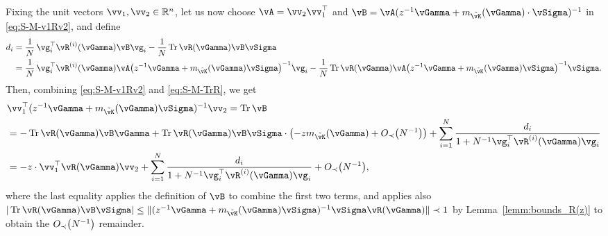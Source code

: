 \begin{proof-of-lemma}
Fixing the unit vectors $\vv_1,\vv_2 \in \R^n$,
let us now choose $\vA=\vv_2\vv_1^\top$ and
$\vB=\vA(z^{-1}\vGamma+m_{\tilde \vK}(\vGamma)\cdot\vSigma )^{-1}$
in \eqref{eq:S-M-v1Rv2}, and define
	\begin{align*}
d_i&=\frac{1}{N}\,\vg_i^\top \vR^{(i)}(\vGamma)\vB\vg_i
	-\frac{1}{N}\Tr \vR(\vGamma)\vB\vSigma\\
&=\frac{1}{N}\,\vg_i^\top \vR^{(i)}(\vGamma)\vA
	\left(z^{-1}\vGamma+m_{\tilde \vK}(\vGamma)\vSigma\right)^{-1}\vg_i
	-\frac{1}{N}\Tr \vR(\vGamma)\vA\left(z^{-1}\vGamma+m_{\tilde
\vK}(\vGamma)\vSigma\right)^{-1}\vSigma.
\end{align*}
Then, combining \eqref{eq:S-M-v1Rv2} and \eqref{eq:S-M-TrR}, we get
	\begin{align}
&\vv_1^\top (z^{-1}\vGamma+m_{\tilde \vK}(\vGamma)\vSigma)^{-1}\vv_2=\Tr
\vB\notag\\
&= {-}\Tr \vR(\vGamma)\vB\vGamma + \Tr
\vR(\vGamma)\vB\vSigma \cdot \left(-zm_{\tilde
\vK}(\vGamma)+\SD{N^{-1}}\right)
+\sum_{i=1}^N\frac{d_i}{1+N^{-1}\vg_i^\top\vR^{(i)}(\vGamma)\vg_i} \notag\\
&= {-}z\cdot\vv_1^\top \vR(\vGamma)\vv_2 +
\sum_{i=1}^N\frac{d_i}{1+N^{-1}\vg_i^\top\vR^{(i)}(\vGamma)\vg_i}+\SD{N^{-1}},\label{eq:J1+J2}
	\end{align} 
where the last equality applies the definition of $\vB$ to combine the first two
terms, and applies also
$|\Tr \vR(\vGamma)\vB\vSigma|
\leq \|(z^{-1}\vGamma+m_{\tilde \vK}(\vGamma)\vSigma)^{-1}\vSigma\vR(\vGamma)\|
\prec 1$ by Lemma~\ref{lemm:bounds_R(z)} to obtain the
$\SD{N^{-1}}$ remainder.


\end{proof-of-lemma}
